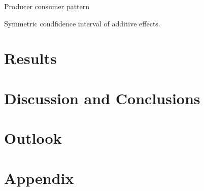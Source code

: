 \documentclass[10pt,a4paper]{article}
\begin{document}
Producer consumer pattern

Symmetric condfidence interval of additive effects.




\section{Results}


\section{Discussion and Conclusions}


\section{Outlook}

\section{Appendix}


\newpage


\end{document}
